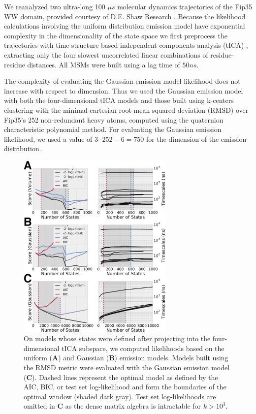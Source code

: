 \documentclass[journal=jpcbfk, layout=twocolumn, manuscript=article]{achemso}
\begin{document}
We reanalyzed two ultra-long 100 $\mu s$ molecular dynamics trajectories of the Fip35 WW domain\cite{Liu2008Experimental}, provided courtesy of D.E. Shaw Research \cite{Shaw2010Atomic}. Because the likelihood calculations involving the uniform distribution emission model have exponential complexity in the dimensionality of the state space we first preprocess the trajectories with time-structure based independent components analysis (tICA) \cite{Schwantes2013Improvements, Perez2013Identification}, extracting only the four slowest uncorrelated linear combinations of residue-residue distances. All MSMs were built using a lag time of $50 ns$.

The complexity of evaluating the Gaussian emission model likelihood does not increase with respect to dimension. Thus we used the Gaussian emission model with both the four-dimensional tICA models and those built using k-centers clustering with the minimal cartesian root-mean squared deviation (RMSD) over Fip35's 252 non-redundant heavy atoms, computed using the quaternion characteristic polynomial method\cite{Theobald2005Rapid}. For evaluating the Gaussian emission likelihood, we used a value of $3 \cdot 252 - 6 = 750$ for the dimension of the emission distribution.

\begin{figure}
\centering
\includegraphics[width=3in]{figs_final/ww_likes.png}
\caption{On models whose states were defined after projecting into the four-dimensional tICA subspace, we computed likelihoods based on the uniform ({\bf A}) and Gaussian ({\bf B}) emission models. Models built using the RMSD metric were evaluated with the Gaussian emission model ({\bf C}). Dashed lines represent the optimal model as defined by the AIC, BIC, or test set log-likelihood and form the boundaries of the optimal window (shaded dark gray). Test set log-likelihoods are omitted in {\bf C} as the dense matrix algebra is intractable for $k > 10^3$.\label{fig:ww}}
\end{figure}
\end{document}
